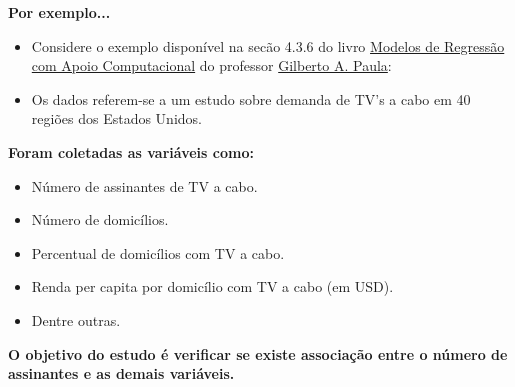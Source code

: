 \documentclass[10pt,
  aspectratio=169,
  serif,
  mathserif,
  professionalfont,
  compress,
  handout,
  ]{beamer}\usepackage[]{graphicx}\usepackage[]{color}
\begin{document}
\begin{frame}[c, allowframebreaks]

\textbf{Por exemplo...}

\begin{itemize}

  \item Considere o exemplo disponível na secão 4.3.6 do livro \href{https://www.ime.usp.br/~giapaula/texto_2013.pdf}{Modelos de Regressão com Apoio Computacional} do professor \href{https://www.ime.usp.br/~giapaula/}{Gilberto A. Paula}:

  \item Os dados referem-se a um estudo sobre demanda de TV's a cabo em 40 regiões dos Estados Unidos. 

\end{itemize}

\end{frame}

\begin{frame}[c, allowframebreaks]

\textbf{Foram coletadas as variáveis como:}

\begin{itemize}

  \item Número de assinantes de TV a cabo.

  \item Número de domicílios.

  \item Percentual de domicílios com TV a cabo.

  \item Renda per capita por domicílio com TV a cabo (em USD).

  \item Dentre outras.

\end{itemize}

\textbf{O objetivo do estudo é verificar se existe associação entre o número de assinantes e as demais variáveis.}

\end{frame}
\end{document}
